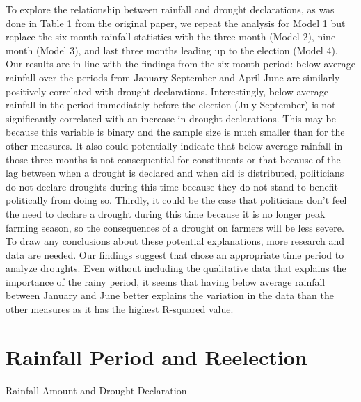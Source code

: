 \documentclass[12pt]{article}
\begin{document}
To explore the relationship between rainfall and drought declarations,
as was done in Table 1 from the original paper, we repeat the analysis
for Model 1 but replace the six-month rainfall statistics with the
three-month (Model 2), nine-month (Model 3), and last three months
leading up to the election (Model 4). Our results are in line with the
findings from the six-month period: below average rainfall over the
periods from January-September and April-June are similarly positively
correlated with drought declarations. Interestingly, below-average
rainfall in the period immediately before the election (July-September)
is not significantly correlated with an increase in drought
declarations. This may be because this variable is binary and the sample
size is much smaller than for the other measures. It also could
potentially indicate that below-average rainfall in those three months
is not consequential for constituents or that because of the lag between
when a drought is declared and when aid is distributed, politicians do
not declare droughts during this time because they do not stand to
benefit politically from doing so. Thirdly, it could be the case that
politicians don't feel the need to declare a drought during this time
because it is no longer peak farming season, so the consequences of a
drought on farmers will be less severe. To draw any conclusions about
these potential explanations, more research and data are needed. Our
findings suggest that \citet{cooperman2021natural} chose an appropriate
time period to analyze droughts. Even without including the qualitative
data that explains the importance of the rainy period, it seems that
having below average rainfall between January and June better explains
the variation in the data than the other measures as it has the highest
R-squared value.

\section{ Rainfall Period and Reelection}
\label{sec:reelection}

\begin{table}[]
  \caption{Rainfall Amount and Drought Declaration}
  
\end{table}
\end{document}
